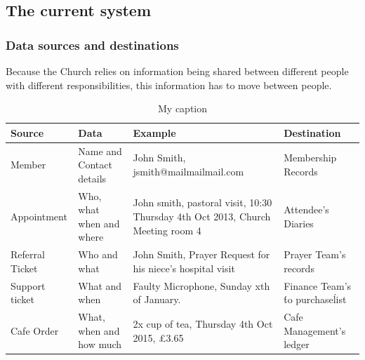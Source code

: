 \subsection{The current system}

\subsubsection{Data sources and destinations}
Because the Church relies on information being shared between different people with different responsibilities, this information has to move between people.

\begin{landscape}

    \begin{table}
    \centering
    \caption{My caption}
    \label{my-label}
    \begin{tabular}{llll}
    \hline
    \multicolumn{1}{|l|}{Source}             & \multicolumn{1}{l|}{Data}                     & \multicolumn{1}{l|}{Example}                                                                         & \multicolumn{1}{l|}{Destination}                       \\ \hline
    \multicolumn{1}{|l|}{Member}             & \multicolumn{1}{l|}{Name and Contact details} & \multicolumn{1}{l|}{John Smith, jsmith@mailmailmail.com}                                             & \multicolumn{1}{l|}{Membership Records}                \\ \hline
    \multicolumn{1}{|l|}{Appointment}        & \multicolumn{1}{l|}{Who, what when and where} & \multicolumn{1}{l|}{John smith, pastoral visit, 10:30 Thursday  4th Oct 2013, Church Meeting room 4} & \multicolumn{1}{l|}{Attendee's Diaries}                \\ \hline
    \multicolumn{1}{|l|}{Referral Ticket}    & \multicolumn{1}{l|}{Who and what}             & \multicolumn{1}{l|}{John Smith, Prayer Request for his niece's hospital visit}                       & \multicolumn{1}{l|}{Prayer Team's records}             \\ \hline
    \multicolumn{1}{|l|}{Support ticket}     & \multicolumn{1}{l|}{What and when}            & \multicolumn{1}{l|}{Faulty Microphone, Sunday xth of January.}                                       & \multicolumn{1}{l|}{Finance Team's \'to purchase\' list} \\ \hline
    \multicolumn{1}{|l|}{Cafe Order}         & \multicolumn{1}{l|}{What, when and how much}  & \multicolumn{1}{l|}{2x cup of tea, Thursday 4th Oct 2015, £3.65}                                     & \multicolumn{1}{l|}{Cafe Management's ledger}          \\ \hline

\end{tabular}
\end{table}
\end{landscape}
